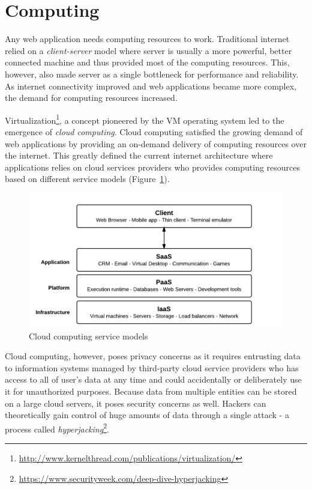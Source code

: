 \section{Computing}
	Any web application needs computing resources to work. Traditional internet relied on a \textit{client-server} model where server is usually a more powerful, better connected machine and thus provided most of the computing resources. This, however, also made server as a single bottleneck for performance and reliability\cite{crowcroft2003peer}. As internet connectivity improved and web applications became more complex, the demand for computing resources increased.
	
	Virtualization\footnote{\url{http://www.kernelthread.com/publications/virtualization/}}, a concept pioneered by the VM\cite{creasy1981origin} operating system led to the emergence of \textit{cloud computing}. Cloud computing satisfied the growing demand of web applications by providing an on-demand delivery of computing resources over the internet. This greatly defined the current internet architecture where applications relies on cloud services providers who provides computing resources based on different service models (Figure~\ref{fig:service-models}).
	
	\begin{figure}[h]
		\includegraphics[width=\linewidth]{figures/service-models}
		\caption{\label{fig:service-models} Cloud computing service models\protect\footnotemark}
	\end{figure}
	
	Cloud computing, however, poses privacy concerns as it requires entrusting data to information systems managed by third-party cloud service providers who has access to all of user's data at any time and could accidentally or deliberately use it for unauthorized purposes\cite{ryan2011cloud}. Because data from multiple entities can be stored on a large cloud servers, it poses security concerns as well. Hackers can theoretically gain control of huge amounts of data through a single attack - a process called \textit{hyperjacking}\footnote{\url{https://www.securityweek.com/deep-dive-hyperjacking}}.
	

